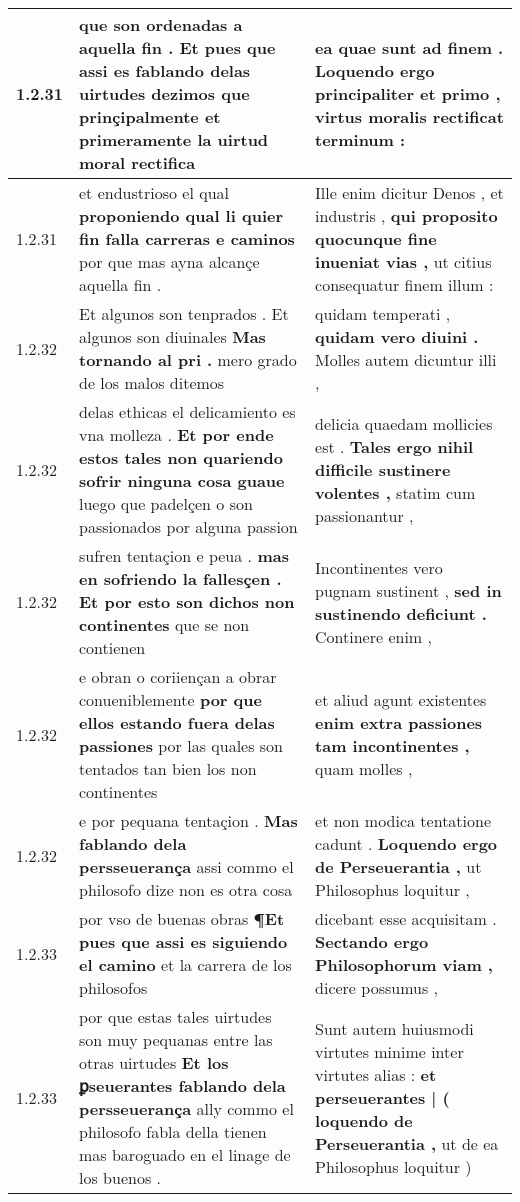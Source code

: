 \begin{tabular}{|p{1cm}|p{6.5cm}|p{6.5cm}|}
1.2.31 & que son ordenadas a aquella fin . \textbf{ Et pues que assi es fablando delas uirtudes dezimos } que prinçipalmente et primeramente la uirtud moral rectifica & ea quae sunt ad finem . \textbf{ Loquendo ergo principaliter et primo , } virtus moralis rectificat terminum : \\\hline
1.2.31 & et endustrioso el qual \textbf{ proponiendo qual li quier fin falla carreras e caminos } por que mas ayna alcançe aquella fin . & Ille enim dicitur Denos , et industris , \textbf{ qui proposito quocunque fine inueniat vias , } ut citius consequatur finem illum : \\\hline
1.2.32 & Et algunos son tenprados . Et algunos son diuinales \textbf{ Mas tornando al pri . } mero grado de los malos ditemos & quidam temperati , \textbf{ quidam vero diuini . } Molles autem dicuntur illi , \\\hline
1.2.32 & delas ethicas el delicamiento es vna molleza . \textbf{ Et por ende estos tales non quariendo sofrir ninguna cosa guaue } luego que padelçen o son passionados por alguna passion & delicia quaedam mollicies est . \textbf{ Tales ergo nihil difficile sustinere volentes , } statim cum passionantur , \\\hline
1.2.32 & sufren tentaçion e peua . \textbf{ mas en sofriendo la fallesçen . Et por esto son dichos non continentes } que se non contienen & Incontinentes vero pugnam sustinent , \textbf{ sed in sustinendo deficiunt . } Continere enim , \\\hline
1.2.32 & e obran o coriiençan a obrar conueniblemente \textbf{ por que ellos estando fuera delas passiones } por las quales son tentados tan bien los non continentes & et aliud agunt existentes \textbf{ enim extra passiones tam incontinentes , } quam molles , \\\hline
1.2.32 & e por pequana tentaçion . \textbf{ Mas fablando dela persseuerança } assi commo el philosofo dize non es otra cosa & et non modica tentatione cadunt . \textbf{ Loquendo ergo de Perseuerantia , } ut Philosophus loquitur , \\\hline
1.2.33 & por vso de buenas obras \textbf{ ¶Et pues que assi es siguiendo el camino } et la carrera de los philosofos & dicebant esse acquisitam . \textbf{ Sectando ergo Philosophorum viam , } dicere possumus , \\\hline
1.2.33 & por que estas tales uirtudes son muy pequanas entre las otras uirtudes \textbf{ Et los ꝑseuerantes fablando dela persseuerança } ally commo el philosofo fabla della tienen mas baroguado en el linage de los buenos . & Sunt autem huiusmodi virtutes minime inter virtutes alias : \textbf{ et perseuerantes | ( loquendo de Perseuerantia , } ut de ea Philosophus loquitur ) \\\hline

\end{tabular}
